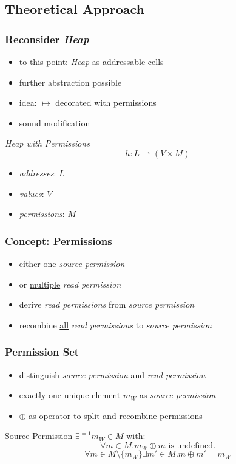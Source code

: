\documentclass{beamer}
\begin{document}
	\subsection{Theoretical Approach}
	\begin{frame}
	\frametitle{Reconsider \emph{Heap}}
	\begin{itemize}
		\item to this point: \emph{Heap} as addressable cells
		\item further abstraction possible
		\item idea: $\mapsto$ decorated with permissions
		\item sound modification
	\end{itemize}
	\begin{block}{\emph{Heap with Permissions}}
		$$h: L \rightharpoonup (V \times M)$$
		\vspace{-0.7cm}
		\begin{itemize}
			\item \emph{addresses}: $L$
			\item \emph{values}: $V$
			\item \emph{permissions}: $M$
		\end{itemize}
	\end{block}
	\end{frame}

	\begin{frame}
	\frametitle{Concept: Permissions}
	\begin{itemize}
		\item either \underline{one} \emph{source permission}
		\item or \underline{multiple} \emph{read permission}
		\item derive \emph{read permissions} from \emph{source permission}
		\item recombine \underline{all} \emph{read permissions} to \emph{source permission}
	\end{itemize}
	\end{frame}

	\begin{frame}
	\frametitle{Permission Set}
	\begin{itemize}
		\item distinguish \emph{source permission} and \emph{read permission}
		\item exactly one unique element $m_W$ as \emph{source permission}
		\item $\oplus$ as operator to split and recombine permissions
	\end{itemize}
	\begin{block}{Source Permission}
		$\exists^{=1}m_W\in M$ with:
		$$\forall m\in M. m_W\oplus m\text{ is undefined.}$$
		$$\forall m\in M\setminus\{m_W\} \exists m'\in M. m\oplus m' = m_W$$
	\end{block}
	\end{frame}
\end{document}
